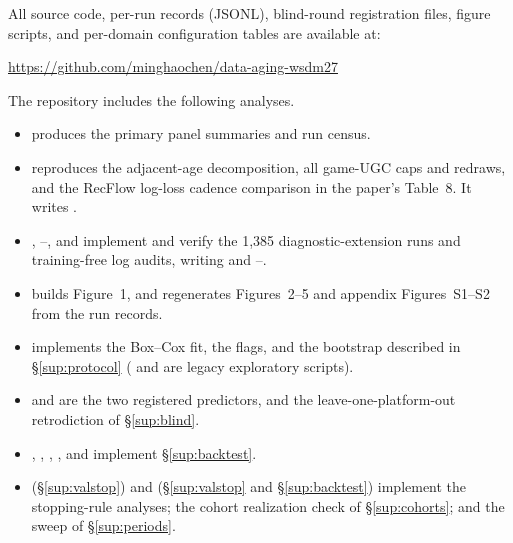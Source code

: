 \documentclass[10pt,letterpaper]{article}
\begin{document}
All source code, per-run records (JSONL), blind-round registration files,
figure scripts, and per-domain configuration tables are available at:
\begin{center}
\url{https://github.com/minghaochen/data-aging-wsdm27}
\end{center}

\noindent
The repository includes the following analyses.

\begin{sloppypar}
\begin{itemize}
\item {} produces the primary panel summaries and run census.
\item {} reproduces the adjacent-age decomposition,
      all game-UGC caps and redraws, and the RecFlow log-loss cadence
      comparison in the paper's Table~8.
      It writes .
\item {}, --,
      and  implement and verify the
      1,385 diagnostic-extension runs and training-free log audits, writing
       and --.
\item {} builds Figure~1, and 
      regenerates Figures~2--5 and appendix Figures~S1--S2 from the run records.
\item {} implements the Box--Cox fit, the flags, and the
      bootstrap described in \S\ref{sup:protocol} ( and
       are legacy exploratory scripts).
\item {} and  are the
      two registered predictors, and  the
      leave-one-platform-out retrodiction of \S\ref{sup:blind}.
\item {}, ,
      , , and
       implement
      \S\ref{sup:backtest}.
\item {} (\S\ref{sup:valstop}) and
       (\S\ref{sup:valstop} and
      \S\ref{sup:backtest}) implement the stopping-rule analyses;
       the cohort realization check of
      \S\ref{sup:cohorts}; and  the sweep of
      \S\ref{sup:periods}.
\end{itemize}
\end{sloppypar}
\end{document}
